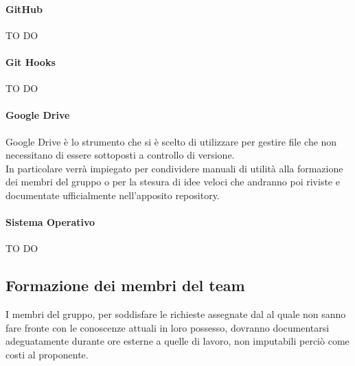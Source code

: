 			\paragraph{GitHub}
TO DO			
			\paragraph{Git Hooks}
TO DO
			\paragraph{Google Drive}
Google Drive è lo strumento che si è scelto di utilizzare per gestire file che non necessitano di essere sottoposti a controllo di versione. \\
In particolare verrà impiegato per condividere manuali di utilità alla formazione dei membri del gruppo o per la stesura di idee veloci che andranno poi riviste e documentate ufficialmente nell'apposito repository.
			\paragraph{Sistema Operativo}
TO DO



	\subsection{Formazione dei membri del team}
I membri del gruppo, per soddisfare le richieste assegnate dal \roleProjectManager{} al quale non sanno fare fronte con le conoscenze attuali in loro possesso, dovranno documentarsi adeguatamente durante ore esterne a quelle di lavoro, non imputabili perciò come costi al proponente.